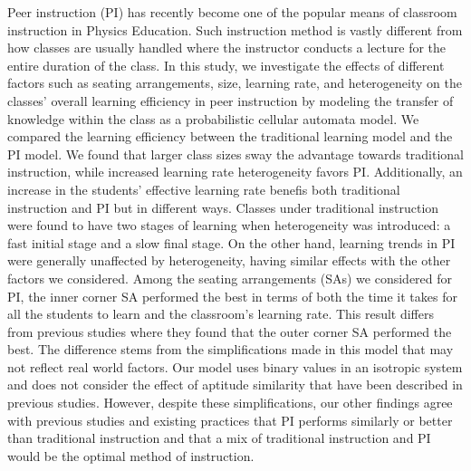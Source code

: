 Peer instruction (PI) has recently become one of the popular means of classroom instruction in Physics Education. 
Such instruction method is vastly different from how classes are usually handled where the instructor conducts a lecture for the entire duration of the class.
In this study, we investigate the effects of different factors such as seating arrangements, size, learning rate, and heterogeneity on the classes' overall learning efficiency in peer instruction by modeling the transfer of knowledge within the class as a probabilistic cellular automata model. 
We compared the learning efficiency between the traditional learning model and the PI model. 
We found that larger class sizes sway the advantage towards traditional instruction, while increased learning rate heterogeneity favors PI.
Additionally, an increase in the students' effective learning rate benefis both traditional instruction and PI but in different ways.
Classes under traditional instruction were found to have two stages of learning when heterogeneity was introduced: a fast initial stage and a slow final stage.
On the other hand, learning trends in PI were generally unaffected by heterogeneity, having similar effects with the other factors we considered.
Among the seating arrangements (SAs) we considered for PI, the inner corner SA performed the best in terms of both the time it takes for all the students to learn and the classroom’s learning rate.
This result differs from previous studies where they found that the outer corner SA performed the best.
The difference stems from the simplifications made in this model that may not reflect real world factors. 
Our model uses binary values in an isotropic system and does not consider the effect of aptitude similarity that have been described in previous studies. 
However, despite these simplifications, our other findings agree with previous studies and existing practices that PI performs similarly or better than traditional instruction and that a mix of traditional instruction and PI would be the optimal method of instruction.

